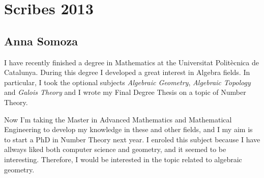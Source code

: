 \chapter*{Scribes 2013}

\section{Anna Somoza}

I have recently finished a degree in Mathematics at the Universitat Politècnica de Catalunya. During this degree I developed a great interest in Algebra fields. In particular, I took the optional subjects \emph{Algebraic Geometry}, \emph{Algebraic Topology} and \emph{Galois Theory} and I wrote my Final Degree Thesis on a topic of Number Theory.

Now I'm taking the Master in Advanced Mathematics and Mathematical Engineering to develop my knowledge in these and other fields, and I my aim is to start a PhD in Number Theory next year. I enroled this subject because I have allways liked both computer science and geometry, and it seemed to be interesting. Therefore, I would be interested in the topic related to algebraic geometry.




